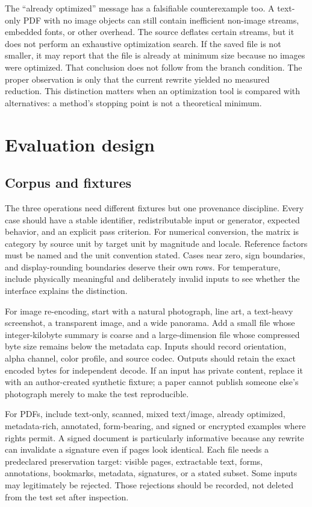 \documentclass[10pt,letterpaper]{article}
\begin{document}
The ``already optimized'' message has a falsifiable counterexample too. A text-only PDF with no image objects can still contain inefficient non-image streams, embedded fonts, or other overhead. The source deflates certain streams, but it does not perform an exhaustive optimization search. If the saved file is not smaller, it may report that the file is already at minimum size because no images were optimized. That conclusion does not follow from the branch condition. The proper observation is only that the current rewrite yielded no measured reduction. This distinction matters when an optimization tool is compared with alternatives: a method's stopping point is not a theoretical minimum.

\section{Evaluation design}

\subsection{Corpus and fixtures}

The three operations need different fixtures but one provenance discipline. Every case should have a stable identifier, redistributable input or generator, expected behavior, and an explicit pass criterion. For numerical conversion, the matrix is category by source unit by target unit by magnitude and locale. Reference factors must be named and the unit convention stated. Cases near zero, sign boundaries, and display-rounding boundaries deserve their own rows. For temperature, include physically meaningful and deliberately invalid inputs to see whether the interface explains the distinction.

For image re-encoding, start with a natural photograph, line art, a text-heavy screenshot, a transparent image, and a wide panorama. Add a small file whose integer-kilobyte summary is coarse and a large-dimension file whose compressed byte size remains below the metadata cap. Inputs should record orientation, alpha channel, color profile, and source codec. Outputs should retain the exact encoded bytes for independent decode. If an input has private content, replace it with an author-created synthetic fixture; a paper cannot publish someone else's photograph merely to make the test reproducible.

For PDFs, include text-only, scanned, mixed text/image, already optimized, metadata-rich, annotated, form-bearing, and signed or encrypted examples where rights permit. A signed document is particularly informative because any rewrite can invalidate a signature even if pages look identical. Each file needs a predeclared preservation target: visible pages, extractable text, forms, annotations, bookmarks, metadata, signatures, or a stated subset. Some inputs may legitimately be rejected. Those rejections should be recorded, not deleted from the test set after inspection.
\end{document}
